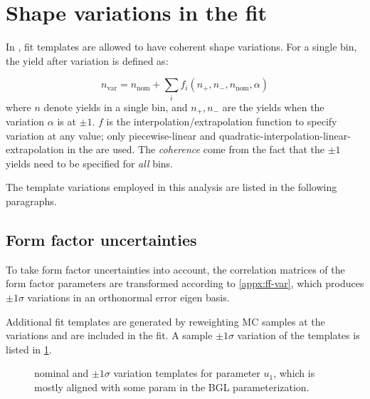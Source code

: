 \section{Shape variations in the fit}
\label{ref:fit:var}

In \HistFactory, fit templates are allowed to have coherent shape variations.
For a single bin, the yield after variation is defined as:

\begin{equation}
    n_\text{var} = n_\text{nom} + \sum_i f_i(n_+, n_-, n_\text{nom}, \alpha)
\end{equation}
where $n$ denote yields in a single bin, and
$n_+, n_-$ are the yields when the variation $\alpha$ is at $\pm 1$.
$f$ is the interpolation/extrapolation function to specify variation
at any value;
only piecewise-linear and quadratic-interpolation-linear-extrapolation
in the \HistFactory are used.
The \emph{coherence} come from the fact that the $\pm 1$ yields need to be
specified for \emph{all} bins.

The template variations employed in this analysis are listed in the following
paragraphs.

\subsection{Form factor uncertainties}

To take form factor uncertainties into account, the correlation
matrices of the form factor parameters are transformed
according to \cref{appx:ff-var}, which produces $\pm 1\sigma$ variations
in an orthonormal error eigen basis.

Additional fit templates are generated by reweighting MC samples at the
variations and are included in the fit.
A sample $\pm 1\sigma$ variation of the \Dz\mun templates is listed in
\cref{fig:fit-variations:ff}.

\begin{figure}[htb]

    \caption{
        \Dz\mun nominal and $\pm 1\sigma$ variation templates for
        parameter $u_1$, which is mostly aligned with
        some param in the BGL parameterization.
    }
    \label{fig:fit-variations:ff}
\end{figure}


